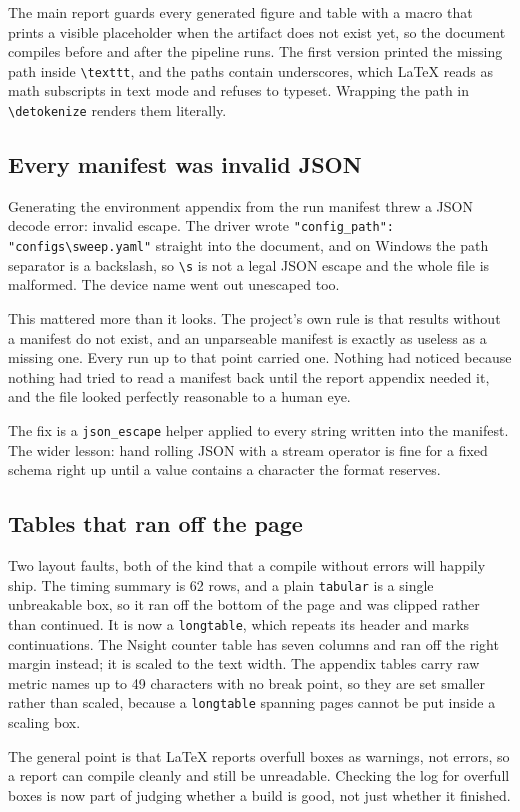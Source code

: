 ﻿\documentclass[11pt]{article}
\begin{document}
The main report guards every generated figure and table with a macro that prints a
visible placeholder when the artifact does not exist yet, so the document compiles
before and after the pipeline runs. The first version printed the missing path
inside \texttt{\textbackslash texttt}, and the paths contain underscores, which
LaTeX reads as math subscripts in text mode and refuses to typeset. Wrapping the
path in \texttt{\textbackslash detokenize} renders them literally.

\subsection{Every manifest was invalid JSON}

Generating the environment appendix from the run manifest threw a JSON decode
error: invalid escape. The driver wrote
\texttt{"config\_path": "configs\textbackslash sweep.yaml"} straight into the
document, and on Windows the path separator is a backslash, so
\texttt{\textbackslash s} is not a legal JSON escape and the whole file is
malformed. The device name went out unescaped too.

This mattered more than it looks. The project's own rule is that results without a
manifest do not exist, and an unparseable manifest is exactly as useless as a
missing one. Every run up to that point carried one. Nothing had noticed because
nothing had tried to read a manifest back until the report appendix needed it, and
the file looked perfectly reasonable to a human eye.

The fix is a \texttt{json\_escape} helper applied to every string written into the
manifest. The wider lesson: hand rolling JSON with a stream operator is fine for a
fixed schema right up until a value contains a character the format reserves.

\subsection{Tables that ran off the page}

Two layout faults, both of the kind that a compile without errors will happily
ship. The timing summary is 62 rows, and a plain \texttt{tabular} is a single
unbreakable box, so it ran off the bottom of the page and was clipped rather than
continued. It is now a \texttt{longtable}, which repeats its header and marks
continuations. The Nsight counter table has seven columns and ran off the right
margin instead; it is scaled to the text width. The appendix tables carry raw
metric names up to 49 characters with no break point, so they are set smaller
rather than scaled, because a \texttt{longtable} spanning pages cannot be put
inside a scaling box.

The general point is that LaTeX reports overfull boxes as warnings, not errors, so
a report can compile cleanly and still be unreadable. Checking the log for
overfull boxes is now part of judging whether a build is good, not just whether it
finished.
\end{document}
